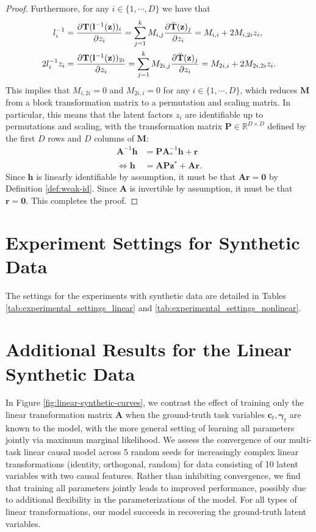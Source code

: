 \documentclass[nohyperref]{article}
\theoremstyle{plain}
\theoremstyle{definition}
\theoremstyle{remark}
\begin{document}
\begin{proof}
    Furthermore, for any $i\in\{1,\cdots,D\}$ we have that
    \begin{align}
        l_i^{-1} &= \frac{\partial \mathbf{T}(\mathbf{l}^{-1}(\mathbf{z}))_i}{\partial z_i}=\sum_{j=1}^k M_{i,j}\frac{\partial \Bar{\mathbf{T}}(\mathbf{z})_j}{\partial z_i}=M_{i,i}+2M_{i,2i}z_i,\\
        2l_i^{-1}z_i &= \frac{\partial \mathbf{T}(\mathbf{l}^{-1}(\mathbf{z}))_{2i}}{\partial z_i}=\sum_{j=1}^k M_{2i,j}\frac{\partial \Bar{\mathbf{T}}(\mathbf{z})_j}{\partial z_i}=M_{2i,i}+2M_{2i,2i}z_i.
    \end{align}
    This implies that $M_{i,2i}=0$ and $M_{2i,i}=0$ for any $i\in\{1,\cdots,D\}$, which reduces $\mathbf{M}$ from a block transformation matrix to a permutation and scaling matrix. In particular, this means that the latent factors $z_i$ are identifiable up to permutations and scaling, with the transformation matrix $\mathbf{P}\in\mathbb{R}^{D\times D}$ defined by the first $D$ rows and $D$ columns of $\mathbf{M}$:
    \begin{align}
        \mathbf{A}^{-1}\mathbf{h}&=\mathbf{P}\mathbf{A}_*^{-1}\mathbf{h}+\mathbf{r}\\
        \iff \mathbf{h}&=\mathbf{A}\mathbf{P}\mathbf{z}^*+\mathbf{A}\mathbf{r}.
    \end{align}
    Since $\mathbf{h}$ is linearly identifiable by assumption, it must be that $\mathbf{A}\mathbf{r}=\mathbf{0}$ by Definition \ref{def:weak-id}. Since $\mathbf{A}$ is invertible by assumption, it must be that $\mathbf{r}=\mathbf{0}$. This completes the proof.
\end{proof}

\section{Experiment Settings for Synthetic Data}\label{appendix:experiment-settings}
The settings for the experiments with synthetic data are detailed in Tables \ref{tab:experimental_settings_linear} and \ref{tab:experimental_settings_nonlinear}.

\section{Additional Results for the Linear Synthetic Data}

In Figure \ref{fig:linear-synthetic-curves}, we contrast the 
effect of training only the linear transformation matrix $\mathbf{A}$ when the ground-truth task variables $\mathbf{c}_t,\boldsymbol{\gamma}_t$ are known to the model, with the more general setting of learning all parameters jointly via maximum marginal likelihood. We assess the convergence of our multi-task linear causal model across 5 random seeds for increasingly complex 
linear transformations (identity, orthogonal, random) for data consisting of 10 latent variables with two causal features. Rather than
inhibiting convergence, we find that training all parameters jointly leads to improved performance, possibly due to additional flexibility in the parameterizations of the model. For all types of linear transformations, our model succeeds in recovering the ground-truth latent variables.
\end{document}
